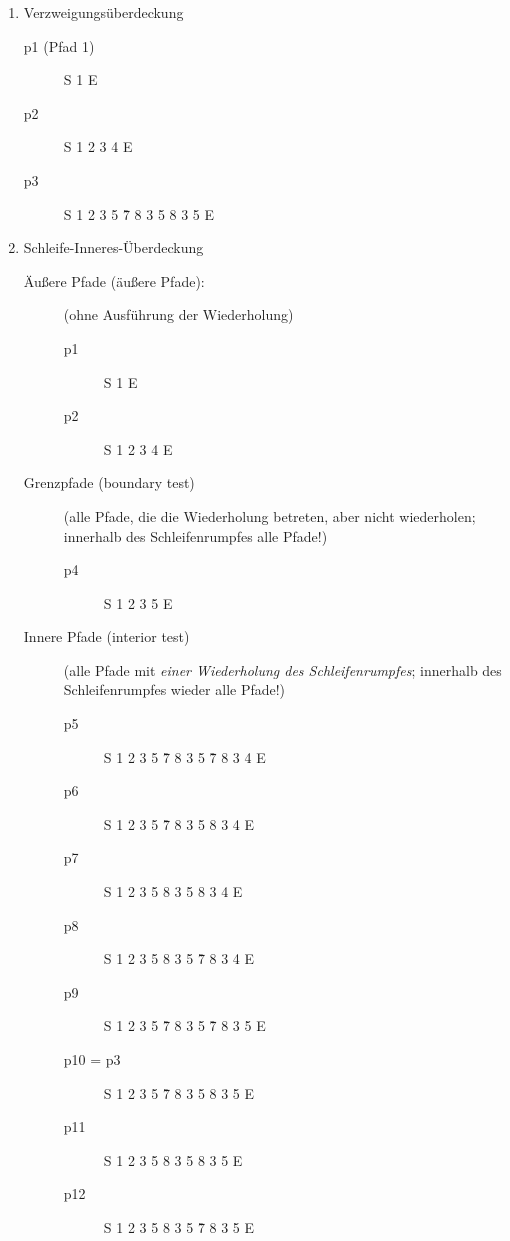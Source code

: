 \documentclass{lehramt-informatik-haupt}
\begin{document}
\begin{enumerate}
\begin{enumerate}
\item Verzweigungsüberdeckung

\begin{liAntwort}
\begin{description}
\item[p1 (Pfad 1)] S 1 E
\item[p2] S 1 2 3 4 E
\item[p3] S 1 2 3 5 \r{7} 8 3 5  8 3 5  E
\end{description}
\end{liAntwort}


\item Schleife-Inneres-Überdeckung

\begin{liAntwort}
\begin{description}
\item[Äußere Pfade (äußere Pfade):]

(ohne Ausführung der Wiederholung)

\begin{description}
\item[p1] S 1 E
\item[p2] S 1 2 3 4 E
\end{description}

\item[Grenzpfade (boundary test)]

(alle Pfade, die die Wiederholung betreten, aber nicht wiederholen;
innerhalb des Schleifenrumpfes alle Pfade!)

\begin{description}
\item[p4] S 1 2 3 5  E
\end{description}

\item[Innere Pfade (interior test)]

(alle Pfade mit \emph{einer Wiederholung des Schleifenrumpfes};
innerhalb des Schleifenrumpfes wieder alle Pfade!)

\begin{description}
\item[p5] S 1 2 3 5 \r{7} 8 3 5 \r{7} 8 3 4 E
\item[p6] S 1 2 3 5 \r{7} 8 3 5  8 3 4 E
\item[p7] S 1 2 3 5  8 3 5  8 3 4 E
\item[p8] S 1 2 3 5  8 3 5 \r{7} 8 3 4 E
\item[p9] S 1 2 3 5 \r{7} 8 3 5 \r{7} 8 3 5  E
\item[p10 = p3] S 1 2 3 5 \r{7} 8 3 5  8 3 5  E
\item[p11] S 1 2 3 5  8 3 5  8 3 5  E
\item[p12] S 1 2 3 5  8 3 5 \r{7} 8 3 5  E
\end{description}
\end{description}
\end{liAntwort}
\end{enumerate}


\end{enumerate}
\end{document}

